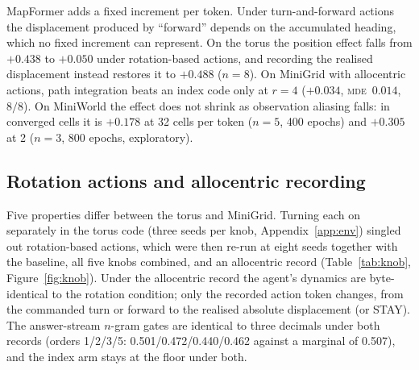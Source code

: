 \documentclass[10pt]{article}
\newcommand{\mde}{\textsc{mde}}
\begin{document}
MapFormer adds a fixed increment per token. Under turn-and-forward actions the displacement produced by
``forward'' depends on the accumulated heading, which no fixed increment can represent. On the torus
the position effect falls from $+0.438$ to $+0.050$ under rotation-based actions, and recording the
realised displacement instead restores it to $+0.488$ ($n=8$). On MiniGrid with allocentric actions,
path integration beats an index code only at $r=4$ ($+0.034$, \mde\ $0.014$, $8/8$). On MiniWorld the
effect does not shrink as observation aliasing falls: in converged cells it is $+0.178$ at 32 cells per
token ($n=5$, 400 epochs) and $+0.305$ at 2 ($n=3$, 800 epochs, exploratory).

\subsection{Rotation actions and allocentric recording}
\label{sec:c2-knob}

Five properties differ between the torus and MiniGrid. Turning each on separately in the torus code
(three seeds per knob, Appendix~\ref{app:env}) singled out rotation-based actions, which were then
re-run at eight seeds together with the baseline, all five knobs combined, and an allocentric record
(Table~\ref{tab:knob}, Figure~\ref{fig:knob}). Under the allocentric record the agent's dynamics are
byte-identical to the rotation condition; only the recorded action token changes, from the commanded
turn or forward to the realised absolute displacement (or STAY). The answer-stream $n$-gram gates are
identical to three decimals under both records (orders 1/2/3/5: 0.501/0.472/0.440/0.462 against a
marginal of 0.507), and the index arm stays at the floor under both.
\end{document}

